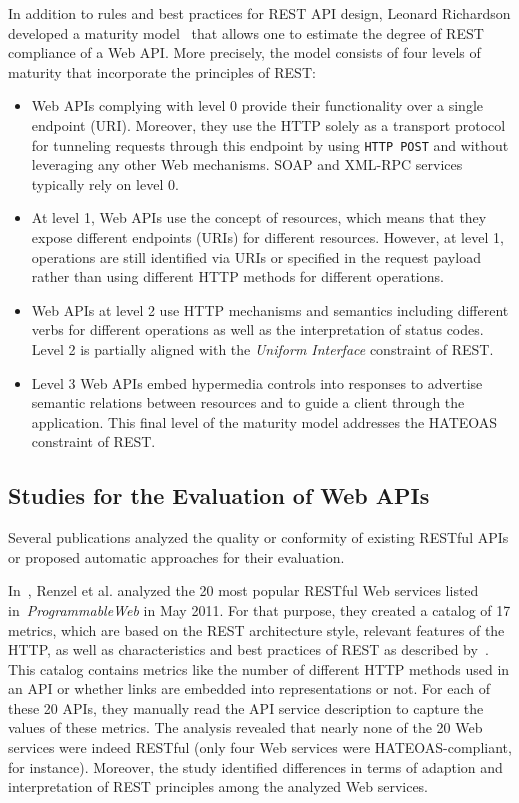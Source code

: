 \documentclass[runningheads]{llncs}
\begin{document}
In addition to rules and best practices for REST API design, Leonard Richardson developed a maturity model~\cite{web:MaturityModel} that allows one to estimate the degree of REST compliance of a Web API. More precisely, the model consists of four levels of maturity that incorporate the principles of REST:
\begin{itemize}
\item Web APIs complying with level 0 provide their functionality over a single endpoint (URI). Moreover, they use the HTTP solely as a transport protocol for tunneling requests through this endpoint by using \texttt{HTTP POST} and without leveraging any other Web mechanisms. SOAP and XML-RPC services typically rely on level 0.
\item At level 1, Web APIs use the concept of resources, which means that they expose different endpoints (URIs) for different resources. However, at level 1, operations are still identified via URIs or specified in the request payload rather than using different HTTP methods for different operations.
\item Web APIs at level 2 use HTTP mechanisms and semantics including different verbs for different operations as well as the interpretation of status codes. Level 2 is partially aligned with the \textit{Uniform Interface} constraint of REST.
\item Level 3 Web APIs embed hypermedia controls into responses to advertise semantic relations between resources and to guide a client through the application. This final level of the maturity model addresses the HATEOAS constraint of REST. 
\end{itemize}

\subsection{Studies for the Evaluation of Web APIs}

Several publications analyzed the quality or conformity of existing RESTful APIs or proposed automatic approaches for their evaluation.

In~\cite{conference:Renzel2012}, Renzel et al. analyzed the 20 most popular RESTful Web services listed in~\textit{ProgrammableWeb} in May 2011. For that purpose, they created a catalog of 17 metrics, which are based on the REST architecture style, relevant features of the HTTP, as well as characteristics and best practices of REST as described by~\cite{book:RichardsonRuby:2007}. This catalog contains metrics like the number of different HTTP methods used in an API or whether links are embedded into representations or not. For each of these 20 APIs, they manually read the API service description to capture the values of these metrics. The analysis revealed that nearly none of the 20 Web services were indeed RESTful (only four Web services were HATEOAS-compliant, for instance). Moreover, the study identified differences in terms of adaption and interpretation of REST principles among the analyzed Web services.
\end{document}

